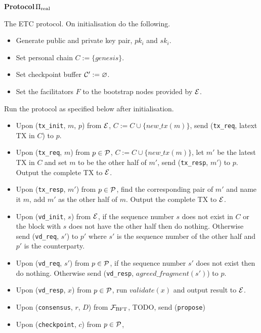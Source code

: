 \begin{framed}
\textbf{Protocol}\,$\Preal$

The ETC protocol. On initialisation do the following.
\begin{itemize}
\item Generate public and private key pair, $pk_i$ and $sk_i$.
\item Set personal chain $C := \{genesis\}$.
\item Set checkpoint buffer $\C' := \varnothing$.
\item Set the facilitators $F$ to the bootstrap nodes provided by $\E$.
\end{itemize}

Run the protocol as specified below after initialisation.
\begin{itemize}

\item Upon (\texttt{tx\_init}, $m$, $p$) from $\E$, 
    $C := C \cup \{new\_tx(m)\}$,
    send (\texttt{tx\_req}, latext TX in $C$) to $p$.
\item Upon (\texttt{tx\_req}, $m$) from $p \in \P$,
    $C := C \cup \{new\_tx(m)\}$,
    let $m'$ be the latest TX in $C$ and set $m$ to be the other half of $m'$,
    send (\texttt{tx\_resp}, $m'$) to $p$.
    Output the complete TX to $\E$.
\item Upon (\texttt{tx\_resp}, $m'$) from $p \in \P$,
    find the corresponding pair of $m'$ and name it $m$,
    add $m'$ as the other half of $m$.
    Output the complete TX to $\E$.

\item Upon (\texttt{vd\_init}, $s$) from $\E$,
    if the sequence number $s$ does not exist in $C$ or the block with $s$ does not have the other half then do nothing.
    Otherwise send (\texttt{vd\_req}, $s'$) to $p'$ where $s'$ is the sequence number of the other half and $p'$ is the counterparty.
\item Upon (\texttt{vd\_req}, $s'$) from $p \in \P$,
    if the sequence number $s'$ does not exist then do nothing.
    Otherwise send (\texttt{vd\_resp}, $agreed\_fragment(s')$) to $p$.
\item Upon (\texttt{vd\_resp}, $x$) from $p \in \P$,
    run $validate(x)$ and output result to $\E$.

\item Upon (\texttt{consensus}, $r$, $D$) from $\F_\text{BFT}$,
    TODO,
    send (\texttt{propose})

\item Upon (\texttt{checkpoint}, $c$) from $p \in \P$,


\end{itemize}

\end{framed}


